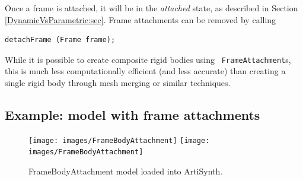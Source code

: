Once a frame is attached, it
will be in the {\it attached} state, as described in Section
\ref{DynamicVsParametric:sec}.  Frame attachments can be removed by
calling
%
\begin{lstlisting}[]
  detachFrame (Frame frame);   
\end{lstlisting}
%

\begin{sideblock}
While it is possible to create composite rigid bodies using {\tt
FrameAttachment}s, this is much less computationally efficient (and
less accurate) than creating a single rigid body through mesh merging
or similar techniques.
\end{sideblock}

\subsection{Example: model with frame attachments}

\begin{figure}[ht]
\begin{center}
\iflatexml
 \texttt{[image: images/FrameBodyAttachment]}
\else
 \texttt{[image: images/FrameBodyAttachment]}
\fi
\end{center}
\caption{FrameBodyAttachment model loaded into ArtiSynth.}
\label{FrameBodyAttachment:fig}
\end{figure}


